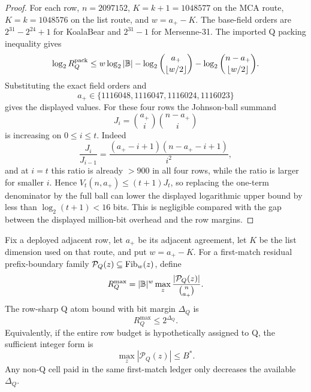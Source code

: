 \documentclass[11pt,a4paper]{amsart}
\numberwithin{equation}{section}
\theoremstyle{remark}
\begin{document}
\begin{proof}
For each row, \(n=2097152\), \(K=k+1=1048577\) on the MCA route, \(K=k=1048576\) on the list route, and \(w=a_+-K\).  The base-field orders are \(2^{31}-2^{24}+1\) for KoalaBear and \(2^{31}-1\) for Mersenne-31.  The imported Q packing inequality \cite[Secs.~19--21]{CAP25v132} gives
\[
        \log_2 R_Q^{\rm pack}
        \le
        w\log_2|\mathbb B|-\log_2\binom{a_+}{\lfloor w/2\rfloor}
             -\log_2\binom{n-a_+}{\lfloor w/2\rfloor}.
\]
Substituting the exact field orders and
\[
        a_+\in\{1116048,1116047,1116024,1116023\}
\]
gives the displayed values.  For these four rows the Johnson-ball summand
\[
        J_i=\binom{a_+}{i}\binom{n-a_+}{i}
\]
is increasing on \(0\le i\le t\).  Indeed
\[
        \frac{J_i}{J_{i-1}}
        =
        \frac{(a_+-i+1)(n-a_+-i+1)}{i^2},
\]
and at \(i=t\) this ratio is already \(>900\) in all four rows, while the ratio is larger for smaller \(i\).  Hence \(V_t(n,a_+)\le(t+1)J_t\), so replacing the one-term denominator by the full ball can lower the displayed logarithmic upper bound by less than \(\log_2(t+1)<16\) bits.  This is negligible compared with the gap between the displayed million-bit overhead and the row margins.
\end{proof}


\begin{definition}\label{def:q-row-atom}
Fix a deployed adjacent row, let \(a_+\) be its adjacent agreement, let \(K\) be the list dimension used on that route, and put \(w=a_+-K\).  For a first-match residual prefix-boundary family \(\mathcal P_Q(z)\subseteq\operatorname{Fib}_w(z)\), define
\[
        R_Q^{\max}
        =
        |\mathbb B|^w\max_z\frac{|\mathcal P_Q(z)|}{\binom n{a_+}}.
\]
The row-sharp Q atom bound with bit margin \(\Delta_Q\) is
\[
        R_Q^{\max}\le 2^{\Delta_Q}.
\]
Equivalently, if the entire row budget is hypothetically assigned to Q, the sufficient integer form is
\[
        \max_z|\mathcal P_Q(z)|\le B^* .
\]
Any non-Q cell paid in the same first-match ledger only decreases the available \(\Delta_Q\).
\end{definition}
\end{document}
